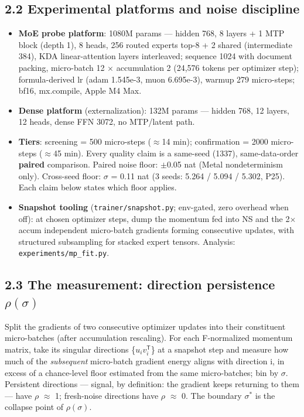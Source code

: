 \documentclass[
]{article}
\providecommand{\tightlist}{%
  \setlength{\itemsep}{0pt}\setlength{\parskip}{0pt}}
\begin{document}
\subsection{2.2 Experimental platforms and noise
discipline}\label{experimental-platforms-and-noise-discipline}

\begin{itemize}
\tightlist
\item
  \textbf{MoE probe platform}: 1080M params --- hidden 768, 8 layers + 1
  MTP block (depth 1), 8 heads, 256 routed experts top-8 + 2 shared
  (intermediate 384), KDA linear-attention layers interleaved; sequence
  1024 with document packing, micro-batch 12 \(\times\) accumulation 2
  (24,576 tokens per optimizer step); formula-derived lr (adam 1.545e-3,
  muon 6.695e-3), warmup 279 micro-steps; bf16, mx.compile, Apple M4
  Max.
\item
  \textbf{Dense platform} (externalization): 132M params --- hidden 768,
  12 layers, 12 heads, dense FFN 3072, no MTP/latent path.
\item
  \textbf{Tiers}: screening = 500 micro-steps (\(\approx\){}14 min);
  confirmation = 2000 micro-steps (\(\approx\){}45 min). Every quality
  claim is a same-seed (1337), same-data-order \textbf{paired}
  comparison. Paired noise floor: \(\pm\){}0.05 nat (Metal
  nondeterminism only). Cross-seed floor: \(\sigma\) = 0.11 nat (3
  seeds: 5.264 / 5.094 / 5.302, P25). Each claim below states which
  floor applies.
\item
  \textbf{Snapshot tooling} (\texttt{trainer/snapshot.py}; env-gated,
  zero overhead when off): at chosen optimizer steps, dump the momentum
  fed into NS and the 2\(\times\){}accum independent micro-batch
  gradients forming consecutive updates, with structured subsampling for
  stacked expert tensors. Analysis: \texttt{experiments/mp\_fit.py}.
\end{itemize}

\subsection{\texorpdfstring{2.3 The measurement: direction persistence
\(\rho(\sigma)\)}{2.3 The measurement: direction persistence \textbackslash rho(\textbackslash sigma)}}\label{the-measurement-direction-persistence-rhosigma}

Split the gradients of two consecutive optimizer updates into their
constituent micro-batches (after accumulation rescaling). For each
F-normalized momentum matrix, take its singular directions
\{\(u_i v_i^{\mathsf{T}}\)\} at a snapshot step and measure how much of
the \emph{subsequent} micro-batch gradient energy aligns with direction
i, in excess of a chance-level floor estimated from the same
micro-batches; bin by \(\sigma\). Persistent directions --- signal, by
definition: the gradient keeps returning to them --- have \(\rho\)
\(\approx\) 1; fresh-noise directions have \(\rho\) \(\approx\) 0. The
boundary \(\sigma^*\) is the collapse point of \(\rho(\sigma)\).
\end{document}
